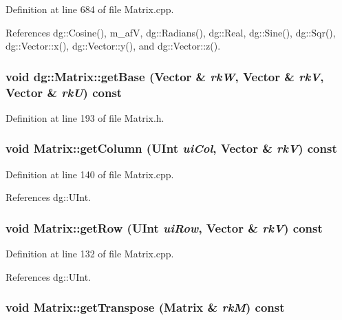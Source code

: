 Definition at line 684 of file Matrix.cpp.

References dg::Cosine(), m\_\-af\-V, dg::Radians(), dg::Real, dg::Sine(), dg::Sqr(), dg::Vector::x(), dg::Vector::y(), and dg::Vector::z().
\subsubsection{\setlength{\rightskip}{0pt plus 5cm}void dg::Matrix::get\-Base ({\bf Vector} \& {\em rk\-W}, {\bf Vector} \& {\em rk\-V}, {\bf Vector} \& {\em rk\-U}) const\hspace{0.3cm}{\tt  [inline]}}\label{classdg_1_1Matrix_a11}




Definition at line 193 of file Matrix.h.
\subsubsection{\setlength{\rightskip}{0pt plus 5cm}void Matrix::get\-Column ({\bf UInt} {\em ui\-Col}, {\bf Vector} \& {\em rk\-V}) const}\label{classdg_1_1Matrix_a13}




Definition at line 140 of file Matrix.cpp.

References dg::UInt.
\subsubsection{\setlength{\rightskip}{0pt plus 5cm}void Matrix::get\-Row ({\bf UInt} {\em ui\-Row}, {\bf Vector} \& {\em rk\-V}) const}\label{classdg_1_1Matrix_a12}




Definition at line 132 of file Matrix.cpp.

References dg::UInt.
\subsubsection{\setlength{\rightskip}{0pt plus 5cm}void Matrix::get\-Transpose (Matrix \& {\em rk\-M}) const}\label{classdg_1_1Matrix_a14}




